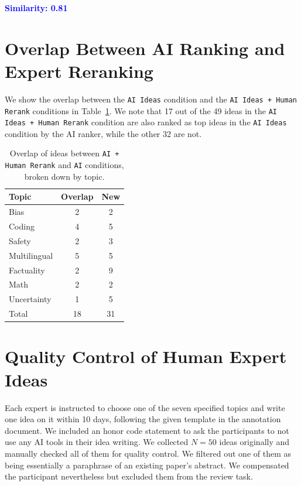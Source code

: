 \vspace{0.5em}

\noindent\textbf{\textcolor{blue}{Similarity: 0.81}} \\



\newpage



\section{Overlap Between AI Ranking and Expert Reranking}
\label{sec:overlap}

We show the overlap between the \texttt{AI Ideas} condition and the \texttt{AI Ideas + Human Rerank} conditions in Table~\ref{table:idea_overlap}. We note that 17 out of the 49 ideas in the \texttt{AI Ideas + Human Rerank} condition are also ranked as top ideas in the \texttt{AI Ideas} condition by the AI ranker, while the other 32 are not. 

\begin{table}[ht]
\centering
\begin{tabular}{l c c} 
 \hline
 Topic & Overlap & New \\ 
 \hline
 Bias & 2 & 2 \\
 Coding & 4 & 5 \\
 Safety & 2 & 3 \\
 Multilingual & 5 & 5 \\
 Factuality & 2 & 9 \\
 Math & 2 & 2 \\
 Uncertainty & 1 & 5 \\
 \hline 
 Total & 18 & 31 \\
 \hline
\end{tabular}
\caption{Overlap of ideas between \texttt{AI + Human Rerank} and \texttt{AI} conditions, broken down by topic.}
\label{table:idea_overlap}
\end{table}



\section{Quality Control of Human Expert Ideas}
\label{sec:idea_quality_control}

Each expert is instructed to choose one of the seven specified topics and write one idea on it within 10 days, following the given template in the annotation document.  
We included an honor code statement to ask the participants to not use any AI tools in their idea writing. 
We collected $N = 50$ ideas originally and manually checked all of them for quality control. We filtered out one of them as being essentially a paraphrase of an existing paper's abstract.
We compensated the participant nevertheless but excluded them from the review task. 




